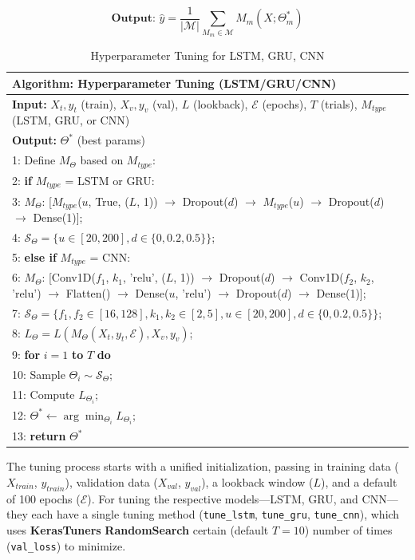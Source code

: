\begin{equation}
\textbf{Output: } \hat{y} = \frac{1}{|\mathcal{M}|} \sum_{M_m \in \mathcal{M}} M_m(X; \Theta_m^*)
\end{equation}

\begin{table}[h]
\small
\centering
\begin{tabular}{|p{14cm}|}
\hline
\textbf{Algorithm: Hyperparameter Tuning (LSTM/GRU/CNN)} \\
\hline
\textbf{Input:} $X_t, y_t$ (train), $X_v, y_v$ (val), $L$ (lookback), $\mathcal{E}$ (epochs), $T$ (trials), $M_{type}$ (LSTM, GRU, or CNN) \\
\textbf{Output:} $\Theta^*$ (best params) \\
\hline
1: Define $M_\Theta$ based on $M_{type}$: \\
2: \quad \textbf{if} $M_{type}$ = LSTM or GRU: \\
3: \quad\quad $M_\Theta$: [$M_{type}$($u$, True, ($L$, 1)) $\rightarrow$ Dropout($d$) $\rightarrow$ $M_{type}$($u$) $\rightarrow$ Dropout($d$) $\rightarrow$ Dense(1)]; \\
4: \quad\quad $\mathcal{S}_\Theta = \{ u \in [20, 200], d \in \{0, 0.2, 0.5\} \}$; \\
5: \quad \textbf{else if} $M_{type}$ = CNN: \\
6: \quad\quad $M_\Theta$: [Conv1D($f_1$, $k_1$, 'relu', ($L$, 1)) $\rightarrow$ Dropout($d$) $\rightarrow$ Conv1D($f_2$, $k_2$, 'relu') $\rightarrow$ Flatten() $\rightarrow$ Dense($u$, 'relu') $\rightarrow$ Dropout($d$) $\rightarrow$ Dense(1)]; \\
7: \quad\quad $\mathcal{S}_\Theta = \{ f_1, f_2 \in [16, 128], k_1, k_2 \in [2, 5], u \in [20, 200], d \in \{0, 0.2, 0.5\} \}$; \\
8: \quad $L_\Theta = L(M_\Theta(X_t, y_t, \mathcal{E}), X_v, y_v)$; \\
9: \textbf{for} $i = 1$ \textbf{to} $T$ \textbf{do} \\
10: \quad Sample $\Theta_i \sim \mathcal{S}_\Theta$; \\
11: \quad Compute $L_{\Theta_i}$; \\
12: $\Theta^* \leftarrow \arg\min_{\Theta_i} L_{\Theta_i}$; \\
13: \textbf{return} $\Theta^*$ \\
\hline
\end{tabular}
\caption{Hyperparameter Tuning for LSTM, GRU, CNN}
\label{tab:dynamic_dl_tuner}
\end{table}
The tuning process starts with a unified initialization, passing in training data ($X_{train}$, $y_{train}$), validation data  ($X_{val}$, $y_{val}$), a lookback window ($L$), and a default of 100 epochs ($\mathcal{E}$). For tuning the respective models—LSTM, GRU, and CNN—they each have a single tuning method  (\texttt{tune\_lstm}, \texttt{tune\_gru}, \texttt{tune\_cnn}), which uses \textbf{KerasTuners} \textbf{RandomSearch} certain  (default $T = 10$) number of times (\texttt{val\_loss}) to minimize.

